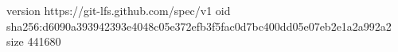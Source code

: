 version https://git-lfs.github.com/spec/v1
oid sha256:d6090a393942393e4048c05e372efb3f5fac0d7bc400dd05e07eb2e1a2a992a2
size 441680
